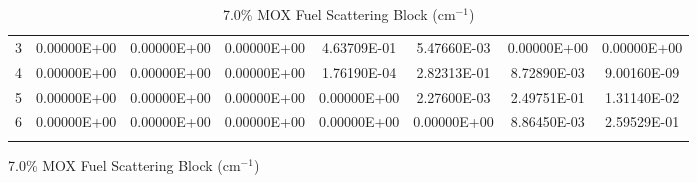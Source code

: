 \begin{figure}
\begin{table}[H]
\begin{subtable}[h]{1.0\textwidth}
{\begin{tabular}{*8c}
3 &	0.00000E+00	 &	0.00000E+00 &	0.00000E+00 &	4.63709E-01 &	5.47660E-03 &	0.00000E+00 &	0.00000E+00 \\
4 &	0.00000E+00	 &	0.00000E+00 &	0.00000E+00 &	1.76190E-04 &	2.82313E-01 &	8.72890E-03 &	9.00160E-09 \\
5 &	0.00000E+00	 &	0.00000E+00 &	0.00000E+00 &	0.00000E+00 &	2.27600E-03 &	2.49751E-01 &	1.31140E-02 \\
6 &	0.00000E+00	 &	0.00000E+00 &	0.00000E+00 &	0.00000E+00 &	0.00000E+00 &	8.86450E-03 &	2.59529E-01 \\
        \bottomrule
        & & & & & & & 
    \end{tabular}}
        \caption{7.0\% MOX Fuel Scattering Block (cm$^{-1}$)}
  \end{subtable}
\end{table}
\end{figure}

